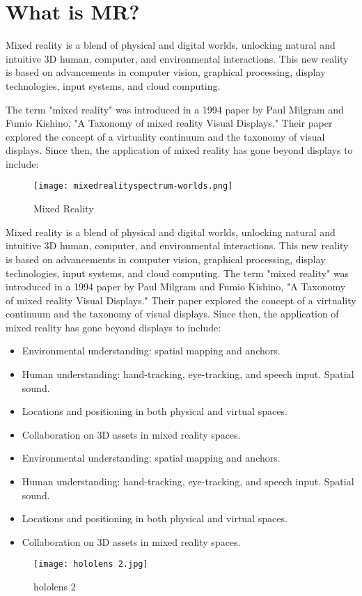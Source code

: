 \documentclass[11pt]{article}
\begin{document}
\section{\textbf{ What is MR?}}
Mixed reality is a blend of physical and digital worlds, unlocking natural and intuitive 3D human, computer, and environmental interactions. This new reality is based on advancements in computer vision, graphical processing, display technologies, input systems, and cloud computing. 



The term "mixed reality" was introduced in a 1994 paper by Paul Milgram and Fumio Kishino, "A Taxonomy of mixed reality Visual Displays." Their paper explored the concept of a virtuality continuum and the taxonomy of visual displays. Since then, the application of mixed reality has gone beyond displays to include:
\begin{figure}[h]
\texttt{[image: mixedrealityspectrum-worlds.png]}
\caption{Mixed Reality}
\end{figure}

Mixed reality is a blend of physical and digital worlds, unlocking natural and intuitive 3D human, computer, and environmental interactions. This new reality is based on advancements in computer vision, graphical processing, display technologies, input systems, and cloud computing. The term "mixed reality" was introduced in a 1994 paper by Paul Milgram and Fumio Kishino, "A Taxonomy of mixed reality Visual Displays." Their paper explored the concept of a virtuality continuum and the taxonomy of visual displays. Since then, the application of mixed reality has gone beyond displays to include:

\begin{itemize}
\item  Environmental understanding: spatial mapping and anchors.
\item  Human understanding: hand-tracking, eye-tracking, and speech input.
Spatial sound.
 \item Locations and positioning in both physical and virtual spaces.
\item  Collaboration on 3D assets in mixed reality spaces.
\item Environmental understanding: spatial mapping and anchors.
\item  Human understanding: hand-tracking, eye-tracking, and speech input.
Spatial sound.
\item  Locations and positioning in both physical and virtual spaces.
\item  Collaboration on 3D assets in mixed reality spaces.

\end{itemize}
\begin{figure}[h]
\centering \texttt{[image: hololens 2.jpg]}
\caption{hololens 2}
\end{figure}
\end{document}
